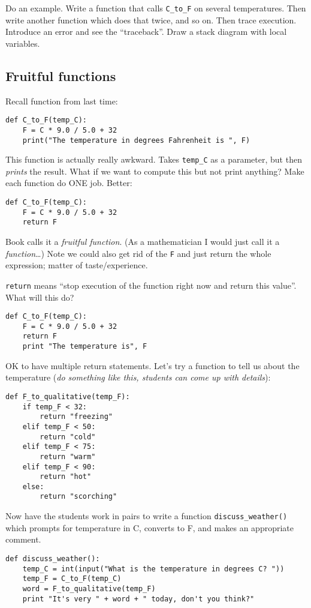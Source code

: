 \documentclass{article}
\begin{document}
Do an example. Write a function that calls \verb|C_to_F| on several
temperatures.  Then write another function which does that twice, and
so on.  Then trace execution.  Introduce an error and see the
``traceback''.  Draw a stack diagram with local variables.

\subsection*{Fruitful functions}

Recall function from last time:
\begin{verbatim}
def C_to_F(temp_C):
    F = C * 9.0 / 5.0 + 32
    print("The temperature in degrees Fahrenheit is ", F)
\end{verbatim}
This function is actually really awkward.  Takes \verb|temp_C| as a
parameter, but then \emph{prints} the result.  What if we want to
compute this but not print anything?  Make each function do ONE job.
Better:
\begin{verbatim}
def C_to_F(temp_C):
    F = C * 9.0 / 5.0 + 32
    return F
\end{verbatim}
Book calls it a \emph{fruitful function}.  (As a mathematician I would
just call it a \emph{function}\dots) Note we could also get rid of the
\verb|F| and just return the whole expression; matter of
taste/experience.

\verb|return| means ``stop execution of the function right now and
return this value''.  What will this do?

\begin{verbatim}
def C_to_F(temp_C):
    F = C * 9.0 / 5.0 + 32
    return F
    print "The temperature is", F
\end{verbatim}

OK to have multiple return statements.  Let's try a function to tell
us about the temperature (\emph{do something like this, students can
  come up with details}):
\begin{verbatim}
def F_to_qualitative(temp_F):
    if temp_F < 32:
        return "freezing"
    elif temp_F < 50:
        return "cold"
    elif temp_F < 75:
        return "warm"
    elif temp_F < 90:
        return "hot"
    else:
        return "scorching"
\end{verbatim}

Now have the students work in pairs to write a function
\verb|discuss_weather()| which prompts for temperature in C, converts
to F, and makes an appropriate comment.

\begin{verbatim}
def discuss_weather():
    temp_C = int(input("What is the temperature in degrees C? "))
    temp_F = C_to_F(temp_C)
    word = F_to_qualitative(temp_F)
    print "It's very " + word + " today, don't you think?"
\end{verbatim}
\end{document}
